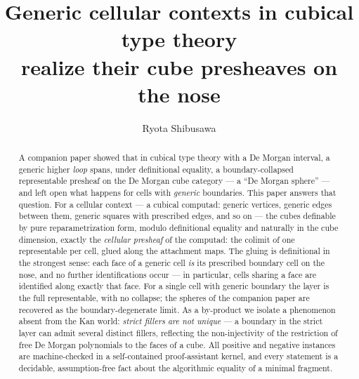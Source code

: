\documentclass[11pt]{amsart}
\theoremstyle{definition}
\begin{document}
\title[Cellular contexts realize their cube presheaves]{Generic
  cellular contexts in cubical type theory\\ realize their cube
  presheaves on the nose}

\author{Ryota Shibusawa}
\address{Daiichi Institute of Technology, Japan}


\begin{abstract}
  A companion paper showed that in cubical type theory with a De
  Morgan interval, a generic higher \emph{loop} spans, under
  definitional equality, a boundary-collapsed representable presheaf
  on the De Morgan cube category --- a ``De Morgan sphere'' --- and
  left open what happens for cells with \emph{generic} boundaries.
  This paper answers that question.  For a cellular context --- a
  cubical computad: generic vertices, generic edges between them,
  generic squares with prescribed edges, and so on --- the cubes
  definable by pure reparametrization form, modulo definitional
  equality and naturally in the cube dimension, exactly the
  \emph{cellular presheaf} of the computad: the colimit of one
  representable per cell, glued along the attachment maps.  The
  gluing is definitional in the strongest sense: each face of a
  generic cell \emph{is} its prescribed boundary cell on the nose,
  and no further identifications occur --- in particular, cells
  sharing a face are identified along exactly that face.  For a
  single cell with generic boundary the layer is the full
  representable, with no collapse; the spheres of the companion
  paper are recovered as the boundary-degenerate limit.  As a
  by-product we isolate a phenomenon absent from the Kan world:
  \emph{strict fillers are not unique} --- a boundary in the strict
  layer can admit several distinct fillers, reflecting the
  non-injectivity of the restriction of free De Morgan polynomials
  to the faces of a cube.  All positive and negative instances are
  machine-checked in a self-contained proof-assistant kernel, and
  every statement is a decidable, assumption-free fact about the
  algorithmic equality of a minimal fragment.
\end{abstract}

\maketitle
\end{document}
